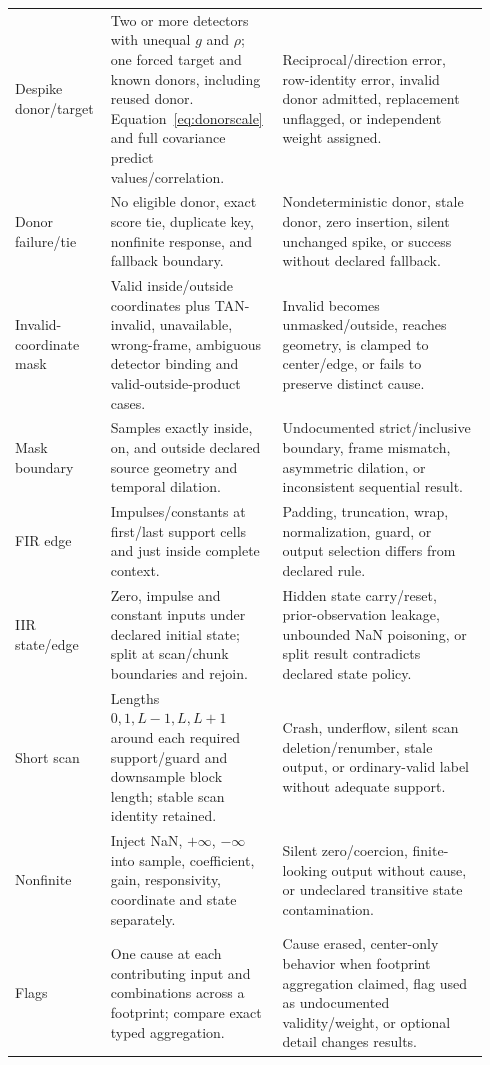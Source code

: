 \documentclass[11pt]{article}
\begin{document}
\begin{longtable}{@{}p{0.18\linewidth}p{0.34\linewidth}p{0.42\linewidth}@{}}
Despike donor/target & Two or more detectors with unequal $g$ and $\rho$; one forced target and known donors, including reused donor.  Equation~\eqref{eq:donorscale} and full covariance predict values/correlation. & Reciprocal/direction error, row-identity error, invalid donor admitted, replacement unflagged, or independent weight assigned. \\
Donor failure/tie & No eligible donor, exact score tie, duplicate key, nonfinite response, and fallback boundary. & Nondeterministic donor, stale donor, zero insertion, silent unchanged spike, or success without declared fallback. \\
Invalid-coordinate mask & Valid inside/outside coordinates plus TAN-invalid, unavailable, wrong-frame, ambiguous detector binding and valid-outside-product cases. & Invalid becomes unmasked/outside, reaches geometry, is clamped to center/edge, or fails to preserve distinct cause. \\
Mask boundary & Samples exactly inside, on, and outside declared source geometry and temporal dilation. & Undocumented strict/inclusive boundary, frame mismatch, asymmetric dilation, or inconsistent sequential result. \\
FIR edge & Impulses/constants at first/last support cells and just inside complete context. & Padding, truncation, wrap, normalization, guard, or output selection differs from declared rule. \\
IIR state/edge & Zero, impulse and constant inputs under declared initial state; split at scan/chunk boundaries and rejoin. & Hidden state carry/reset, prior-observation leakage, unbounded NaN poisoning, or split result contradicts declared state policy. \\
Short scan & Lengths $0,1,L-1,L,L+1$ around each required support/guard and downsample block length; stable scan identity retained. & Crash, underflow, silent scan deletion/renumber, stale output, or ordinary-valid label without adequate support. \\
Nonfinite & Inject NaN, $+\infty$, $-\infty$ into sample, coefficient, gain, responsivity, coordinate and state separately. & Silent zero/coercion, finite-looking output without cause, or undeclared transitive state contamination. \\
Flags & One cause at each contributing input and combinations across a footprint; compare exact typed aggregation. & Cause erased, center-only behavior when footprint aggregation claimed, flag used as undocumented validity/weight, or optional detail changes results. \\

\end{longtable}
\end{document}
